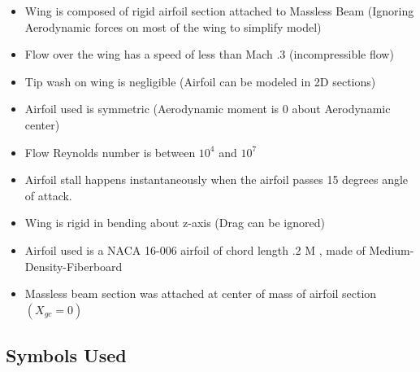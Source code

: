 \documentclass[]{article}
\begin{document}
\begin{itemize}
	
	\item Wing is composed of rigid airfoil section attached to Massless Beam (Ignoring Aerodynamic forces on most of the wing to simplify model)
	
	\item Flow over the wing has a speed of less than Mach .3 (incompressible flow)
	
	\item Tip wash on wing is negligible (Airfoil can be modeled in 2D sections)
	
	\item Airfoil used is symmetric (Aerodynamic moment is 0 about Aerodynamic center)
	
	\item Flow Reynolds number is between $10^4$ and $10^7$
	
	\item Airfoil stall happens instantaneously when the airfoil passes 15 degrees angle of attack. 
	
	\item Wing is rigid in bending about z-axis (Drag can be ignored)
	
	\item Airfoil used is a NACA 16-006 airfoil of chord length .2 M , made of Medium-Density-Fiberboard
	
	\item Massless beam section was attached at center of mass of airfoil section $(X_{gc} = 0)$
	

\end{itemize}


\subsection{Symbols Used}
\end{document}
